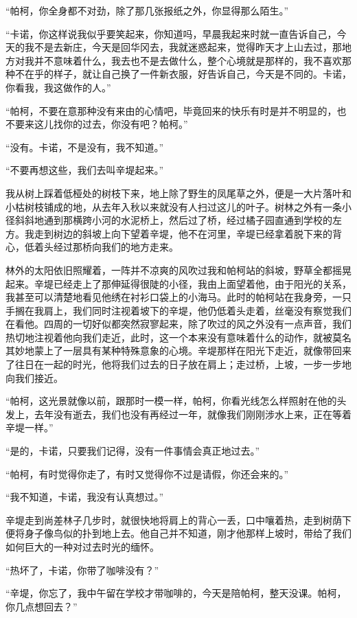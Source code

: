 \par “帕柯，你全身都不对劲，除了那几张报纸之外，你显得那么陌生。”
\par “卡诺，你这样说我似乎要笑起来，你知道吗，早晨我起来时就一直告诉自己，今天的我不是去新庄，今天是回华冈去，我就迷惑起来，觉得昨天才上山去过，那地方对我并不意味着什么，我去也不是去做什么，整个心境就是那样的，我不喜欢那种不在乎的样子，就让自己换了一件新衣服，好告诉自己，今天是不同的。卡诺，你看我，我这做作的人。”
\par “帕柯，不要在意那种没有来由的心情吧，毕竟回来的快乐有时是并不明显的，也不要来这儿找你的过去，你没有吧？帕柯。”
\par “没有。卡诺，不是没有，我不知道。”
\par “不要再想这些，我们去叫辛堤起来。”
\par 我从树上踩着低桠处的树枝下来，地上除了野生的凤尾草之外，便是一大片落叶和小枯树枝铺成的地，从去年入秋以来就没有人扫过这儿的叶子。树林之外有一条小径斜斜地通到那横跨小河的水泥桥上，然后过了桥，经过橘子园直通到学校的左方。我走到树边的斜坡上向下望着辛堤，他不在河里，辛堤已经拿着脱下来的背心，低着头经过那桥向我们的地方走来。
\par 林外的太阳依旧照耀着，一阵并不凉爽的风吹过我和帕柯站的斜坡，野草全都摇晃起来。辛堤已经走上了那伸延得很陡的小径，我由上面望着他，由于阳光的关系，我甚至可以清楚地看见他绣在衬衫口袋上的小海马。此时的帕柯站在我身旁，一只手搁在我肩上，我们同时注视着坡下的辛堤，他仍低着头走着，丝毫没有察觉我们在看他。四周的一切好似都突然寂寥起来，除了吹过的风之外没有一点声音，我们热切地注视着他向我们走近，此时，这一个本来没有意味着什么的动作，就被莫名其妙地蒙上了一层具有某种特殊意象的心境。辛堤那样在阳光下走近，就像带回来了往日在一起的时光，他将我们过去的日子放在肩上；走过桥，上坡，一步一步地向我们接近。
\par “帕柯，这光景就像以前，跟那时一模一样，帕柯，你看光线怎么样照射在他的头发上，去年没有逝去，我们也没有再经过一年，就像我们刚刚涉水上来，正在等着辛堤一样。”
\par “是的，卡诺，只要我们记得，没有一件事情会真正地过去。”
\par “帕柯，有时觉得你走了，有时又觉得你不过是请假，你还会来的。”
\par “我不知道，卡诺，我没有认真想过。”
\par 辛堤走到尚差林子几步时，就很快地将肩上的背心一丢，口中嚷着热，走到树荫下便将身子像鸟似的扑到地上去。他自己并不知道，刚才他那样上坡时，带给了我们如何巨大的一种对过去时光的缅怀。
\par “热坏了，卡诺，你带了咖啡没有？”
\par “辛堤，你忘了，我中午留在学校才带咖啡的，今天是陪帕柯，整天没课。帕柯，你几点想回去？”
